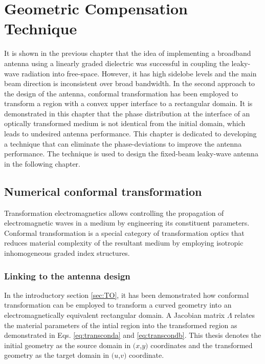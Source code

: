 


\chapter{Geometric Compensation Technique} %
\label{Chapter2} 
It is shown in the previous chapter that the idea of implementing a broadband antenna using a linearly graded dielectric was successful in coupling the leaky-wave radiation into free-space. However, it has high sidelobe levels and the main beam direction is inconsistent over broad bandwidth. In the second approach to the design of the antenna, conformal transformation has been employed to transform a region with a convex upper interface to a rectangular domain. It is demonstrated in this chapter that the phase distribution at the interface of an optically transformed medium is not identical from the initial domain, which leads to undesired antenna performance. This chapter is dedicated to developing a technique that can eliminate the phase-deviations to improve the antenna performance. The technique is used to design the fixed-beam leaky-wave antenna in the following chapter.

\section{Numerical conformal transformation}
Transformation electromagnetics allows controlling the propagation of electromagnetic waves in a medium by engineering its constituent parameters. Conformal transformation is a special category of transformation optics that reduces material complexity of the resultant medium by employing isotropic inhomogeneous graded index structures.

\subsection{Linking to the antenna design}
In the introductory section \ref{sec:TO}, it has been demonstrated how conformal transformation can be employed to transform a curved geometry into an electromagnetically equivalent rectangular domain. A Jacobian matrix $\Lambda$ relates the material parameters of the intial region into the transformed region as demonstrated in Eqs. \ref{eq:transconda} and \ref{eq:transcondb}. This thesis denotes the initial geometry as the source domain in $(x$,$y)$ coordinates and the transformed geometry as the target domain in $(u$,$v)$ coordinate. %

